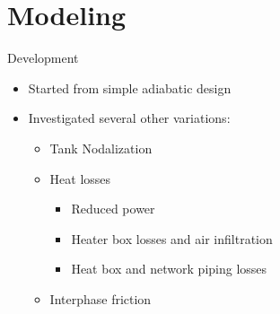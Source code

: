 \documentclass[10pt,t,xcolor=table]{UWMadBeamer}
\begin{document}


\section{Modeling}


\begin{frame}{Development}
    \begin{itemize}
        \item Started from simple adiabatic design
        \item Investigated several other variations:
        \begin{itemize}
            \item Tank Nodalization
            \item Heat losses
                \begin{itemize}
                    \item Reduced power
                    \item Heater box losses and air infiltration
                    \item Heat box and network piping losses
                \end{itemize}
            \item Interphase friction
        \end{itemize}
    \end{itemize}
\end{frame}
\end{document}
